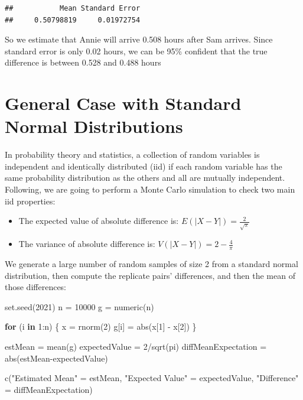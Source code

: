 \documentclass[
]{book}
\newenvironment{Shaded}{\begin{snugshade}}{\end{snugshade}}
\newcommand{\ControlFlowTok}[1]{\textcolor[rgb]{0.13,0.29,0.53}{\textbf{#1}}}
\newcommand{\DecValTok}[1]{\textcolor[rgb]{0.00,0.00,0.81}{#1}}
\newcommand{\FunctionTok}[1]{\textcolor[rgb]{0.00,0.00,0.00}{#1}}
\newcommand{\NormalTok}[1]{#1}
\newcommand{\OtherTok}[1]{\textcolor[rgb]{0.56,0.35,0.01}{#1}}
\newcommand{\SpecialCharTok}[1]{\textcolor[rgb]{0.00,0.00,0.00}{#1}}
\newcommand{\StringTok}[1]{\textcolor[rgb]{0.31,0.60,0.02}{#1}}
\providecommand{\tightlist}{%
  \setlength{\itemsep}{0pt}\setlength{\parskip}{0pt}}
\begin{document}
\begin{verbatim}
##           Mean Standard Error 
##     0.50798819     0.01972754
\end{verbatim}

So we estimate that Annie will arrive 0.508 hours after Sam arrives. Since standard error is only 0.02 hours, we can be 95\% confident that the true difference is between 0.528 and 0.488 hours

\hypertarget{general-case-with-standard-normal-distributions}{%
\section{General Case with Standard Normal Distributions}\label{general-case-with-standard-normal-distributions}}

In probability theory and statistics, a collection of random variables is independent and identically distributed (iid) if each random variable has the same probability distribution as the others and all are mutually independent. Following, we are going to perform a Monte Carlo simulation to check two main iid properties:

\begin{itemize}
\tightlist
\item
  The expected value of absolute difference is: \(E(|X-Y|)=\frac{2}{\sqrt{\pi}}\)
\item
  The variance of absolute difference is: \(V(|X-Y|) = 2- \frac{4}{\pi}\)
\end{itemize}

We generate a large number of random samples of size 2 from a standard normal distribution, then compute the replicate pairs' differences, and then the mean of those differences:

\begin{Shaded}
\begin{Highlighting}[]
\FunctionTok{set.seed}\NormalTok{(}\DecValTok{2021}\NormalTok{)}
\NormalTok{n }\OtherTok{=} \DecValTok{10000}
\NormalTok{g }\OtherTok{=} \FunctionTok{numeric}\NormalTok{(n)}

\ControlFlowTok{for}\NormalTok{ (i }\ControlFlowTok{in} \DecValTok{1}\SpecialCharTok{:}\NormalTok{n) \{}
\NormalTok{  x }\OtherTok{=} \FunctionTok{rnorm}\NormalTok{(}\DecValTok{2}\NormalTok{)}
\NormalTok{  g[i] }\OtherTok{=} \FunctionTok{abs}\NormalTok{(x[}\DecValTok{1}\NormalTok{] }\SpecialCharTok{{-}}\NormalTok{ x[}\DecValTok{2}\NormalTok{])}
\NormalTok{\}}

\NormalTok{estMean }\OtherTok{=} \FunctionTok{mean}\NormalTok{(g)}
\NormalTok{expectedValue }\OtherTok{=} \DecValTok{2}\SpecialCharTok{/}\FunctionTok{sqrt}\NormalTok{(pi)}
\NormalTok{diffMeanExpectation }\OtherTok{=} \FunctionTok{abs}\NormalTok{(estMean}\SpecialCharTok{{-}}\NormalTok{expectedValue)}

\FunctionTok{c}\NormalTok{(}\StringTok{"Estimated Mean"} \OtherTok{=}\NormalTok{ estMean, }\StringTok{"Expected Value"} \OtherTok{=}\NormalTok{ expectedValue, }\StringTok{"Difference"} \OtherTok{=}\NormalTok{ diffMeanExpectation)}
\end{Highlighting}
\end{Shaded}
\end{document}
